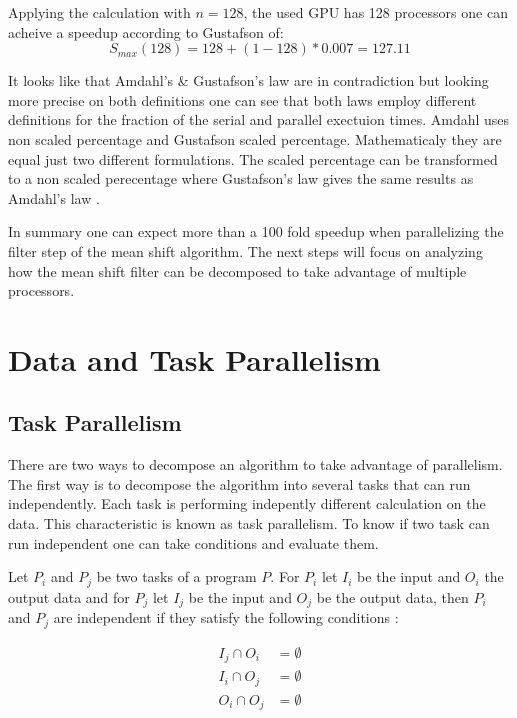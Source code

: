Applying the calculation with $n = 128$, the used \gls{GPU} has 128 processors one
can acheive a speedup according to Gustafson of:
\begin{equation*}\label{eq:g92sp}
		S_{max}(128) = 128 + (1 - 128) * 0.007 = 127.11
\end{equation*}


It looks like that Amdahl's \& Gustafson's law are in contradiction but looking
more precise on both definitions one can see that both laws employ different
definitions for the fraction of the serial and parallel exectuion times. Amdahl
uses non scaled percentage and Gustafson scaled percentage. Mathematicaly they
are equal just two different formulations. The scaled percentage can be
transformed to a non scaled perecentage where Gustafson's law gives the same
results as Amdahl's law \citep{citeulike:3838998}.

In summary one can expect more than a 100 fold speedup when parallelizing the
filter step of the mean shift algorithm. The next steps will  focus on analyzing
how the mean shift filter can be decomposed to take advantage of 
multiple processors.

\section{Data and Task Parallelism} %
\label{sec:data_and_task_parallelism}


\subsection{Task Parallelism} %
\label{sub:task_parallelism}

There are two ways to decompose an algorithm to take advantage of parallelism.
The first way is to decompose the algorithm into several tasks that can run
independently. Each task is performing indepently different calculation on the
data. This characteristic is known as task parallelism. To know if two task can
run independent one can take \citeauthor{citeulike:6113408} conditions and
evaluate them.

Let $P_i$ and $P_j$ be two tasks of a program $P$. For $P_i$ let $I_i$ be the
input and $O_i$ the output data and for $P_j$ let $I_j$ be the input and $O_j$ 
be the output data, then $P_i$ and $P_j$ are independent if they satisfy the
following conditions \citep{citeulike:3838998}:  

\begin{subequations}\label{eq:bern_cond}
	\begin{align}
		I_j \cap O_i & = \emptyset \label{eq:bern0}\\ 
		I_i \cap O_j & = \emptyset \label{eq:bern1}\\
		O_i \cap O_j & = \emptyset \label{eq:bern2}
	\end{align}
\end{subequations}

